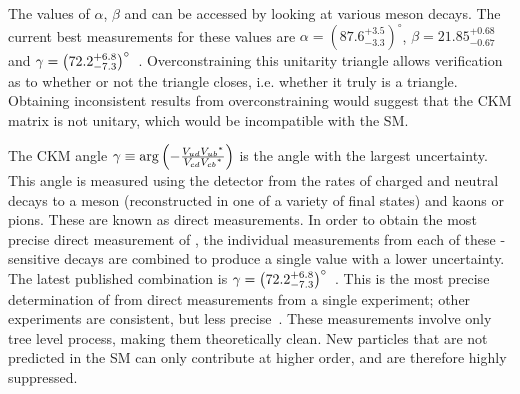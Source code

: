 The values of $\alpha$, $\beta$ and \Pgamma can be accessed by looking at various \B meson decays. The current best measurements for these values are $\alpha = \left(87.6^{+3.5}_{-3.3}\right)^{\circ}$, $\beta = 21.85^{+0.68}_{-0.67}$ and $\gamma = \left(72.2^{+6.8}_{-7.3}\right)^{\circ}$~\cite{PDG2016,LHCb-PAPER-2016-032}. Overconstraining this unitarity triangle allows verification as to whether or not the triangle closes, i.e. whether it truly is a triangle. Obtaining inconsistent results from overconstraining would suggest that the CKM matrix is not unitary, which would be incompatible with the SM. 

The CKM angle $\gamma \equiv \arg\left(-\frac{{V_{{u}{d}}}{{V_{{u}{b}}}}^*}{{V_{{c}{d}}}{{V_{{c}{b}}}}^*}\right)$ is the angle with the largest uncertainty. This angle is measured using the \lhcb detector from the rates of charged and neutral \B decays to a \D meson (reconstructed in one of a variety of final states) and kaons or pions. These are known as direct measurements. In order to obtain the most precise direct measurement of \Pgamma, the individual measurements from each of these \Pgamma-sensitive decays are combined to produce a single value with a lower uncertainty. The latest published \lhcb combination is $\gamma = \left(72.2^{+6.8}_{-7.3}\right)^{\circ}$~\cite{LHCb-PAPER-2016-032}. This is the most precise determination of \Pgamma from direct measurements from a single experiment; other experiments are consistent, but less precise~\cite{Babar_gamma,Belle_gamma}. These measurements involve only tree level process, making them theoretically clean. New particles that are not predicted in the SM can only contribute at higher order, and are therefore highly suppressed.

